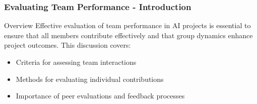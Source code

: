 \documentclass[aspectratio=169]{beamer}
\begin{document}
\begin{frame}[fragile]
    \frametitle{Evaluating Team Performance - Introduction}
    \begin{block}{Overview}
        Effective evaluation of team performance in AI projects is essential to ensure that all members contribute effectively and that group dynamics enhance project outcomes. This discussion covers:
    \end{block}
    \begin{itemize}
        \item Criteria for assessing team interactions
        \item Methods for evaluating individual contributions
        \item Importance of peer evaluations and feedback processes
    \end{itemize}
\end{frame}
\end{document}
